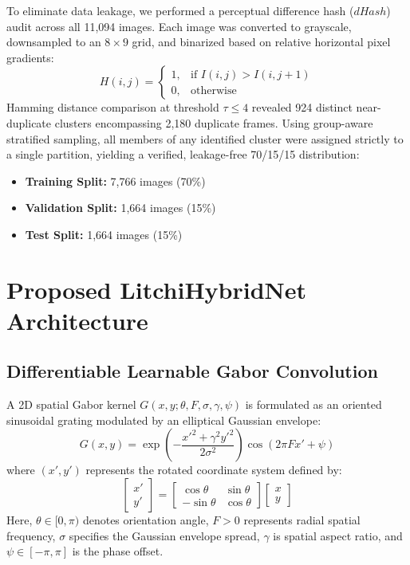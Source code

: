 \documentclass[journal]{IEEEtran}
\begin{document}
To eliminate data leakage, we performed a perceptual difference hash ($dHash$) audit across all 11,094 images. Each image was converted to grayscale, downsampled to an $8 \times 9$ grid, and binarized based on relative horizontal pixel gradients:
\begin{equation}
    H(i, j) = \begin{cases} 1, & \text{if } I(i, j) > I(i, j+1) \\ 0, & \text{otherwise} \end{cases}
\end{equation}
Hamming distance comparison at threshold $\tau \le 4$ revealed 924 distinct near-duplicate clusters encompassing 2,180 duplicate frames. Using group-aware stratified sampling, all members of any identified cluster were assigned strictly to a single partition, yielding a verified, leakage-free 70/15/15 distribution:
\begin{itemize}
    \item \textbf{Training Split:} 7,766 images (70\%)
    \item \textbf{Validation Split:} 1,664 images (15\%)
    \item \textbf{Test Split:} 1,664 images (15\%)
\end{itemize}

\section{Proposed LitchiHybridNet Architecture}

\subsection{Differentiable Learnable Gabor Convolution}
A 2D spatial Gabor kernel $G(x, y; \theta, F, \sigma, \gamma, \psi)$ is formulated as an oriented sinusoidal grating modulated by an elliptical Gaussian envelope:
\begin{equation}
    G(x, y) = \exp\left(-\frac{{x'}^2 + \gamma^2 {y'}^2}{2\sigma^2}\right) \cos(2\pi F x' + \psi)
\end{equation}
where $(x', y')$ represents the rotated coordinate system defined by:
\begin{equation}
    \begin{bmatrix} x' \\ y' \end{bmatrix} = \begin{bmatrix} \cos\theta & \sin\theta \\ -\sin\theta & \cos\theta \end{bmatrix} \begin{bmatrix} x \\ y \end{bmatrix}
\end{equation}
Here, $\theta \in [0, \pi)$ denotes orientation angle, $F > 0$ represents radial spatial frequency, $\sigma$ specifies the Gaussian envelope spread, $\gamma$ is spatial aspect ratio, and $\psi \in [-\pi, \pi]$ is the phase offset.
\end{document}

